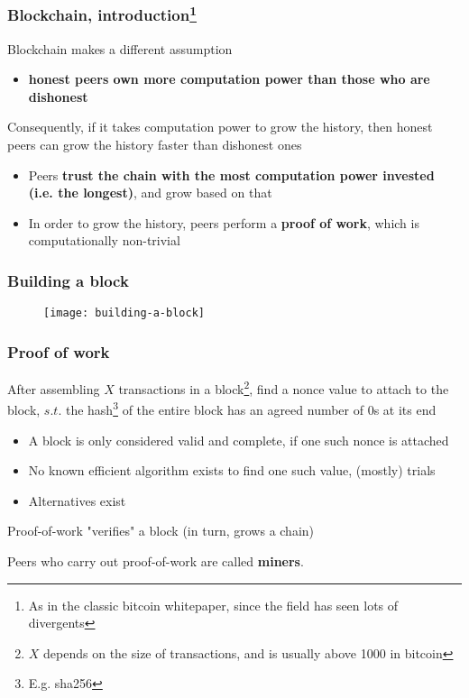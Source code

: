 \documentclass{beamer}
\begin{document}
\begin{frame}
\frametitle{Blockchain, introduction\footnote{As in the classic bitcoin whitepaper, since the field has seen lots of divergents}}

Blockchain makes a different assumption
\begin{itemize}
  \item \textbf{honest peers own more computation power than those who are dishonest}
\end{itemize}

\vspace{0.2in}

Consequently, if it takes computation power to grow the history, then honest peers can grow the history faster than dishonest ones
\begin{itemize}
  \item Peers \textbf{trust the chain with the most computation power invested (i.e. the longest)}, and grow based on that
  \item In order to grow the history, peers perform a \textbf{proof of work}, which is computationally non-trivial
\end{itemize}

\end{frame}

\begin{frame}
\frametitle{Building a block}

\begin{figure}
  \centering
  \texttt{[image: building-a-block]}
\end{figure}

\end{frame}

\begin{frame}
\frametitle{Proof of work}

After assembling $X$ transactions in a block\footnote{$X$ depends on the size of transactions, and is usually above 1000 in bitcoin}, find a nonce value to attach to the block, $s.t.$ the hash\footnote{E.g. sha256} of the entire block has an agreed number of $0$s at its end
\begin{itemize}
  \item A block is only considered valid and complete, if one such nonce is attached
  \item No known efficient algorithm exists to find one such value, (mostly) trials
  \item Alternatives exist
\end{itemize}

\vspace{0.2in}
Proof-of-work "verifies" a block (in turn, grows a chain)

\vspace{0.2in}
Peers who carry out proof-of-work are called \textbf{miners}.

\end{frame}
\end{document}
